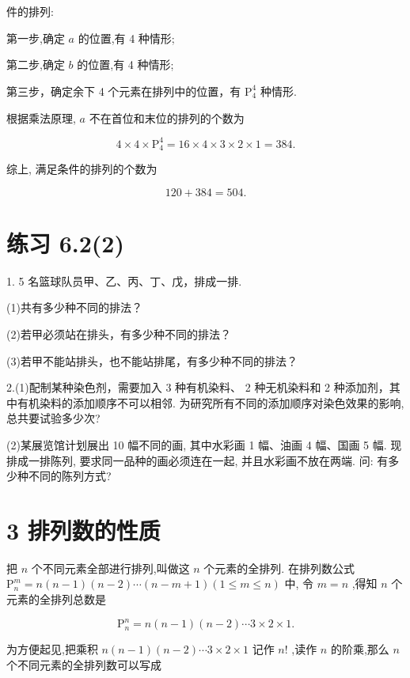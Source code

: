 \documentclass[10pt]{article}
\begin{document}
\section*{}

件的排列:

第一步,确定 \(a\) 的位置,有 4 种情形;

第二步,确定 \(b\) 的位置,有 4 种情形;

第三步，确定余下 4 个元素在排列中的位置，有 \({\mathrm{P}}_{4}^{4}\) 种情形.

根据乘法原理, \(a\) 不在首位和末位的排列的个数为

\[
4 \times  4 \times  {\mathrm{P}}_{4}^{4} = {16} \times  4 \times  3 \times  2 \times  1 = {384}.
\]

综上, 满足条件的排列的个数为

\[
{120} + {384} = {504}.
\]

\section*{练习 6.2(2)}

1. 5 名篮球队员甲、乙、丙、丁、戊，排成一排.

(1)共有多少种不同的排法？

(2)若甲必须站在排头，有多少种不同的排法？

(3)若甲不能站排头，也不能站排尾，有多少种不同的排法？

2.(1)配制某种染色剂，需要加入 3 种有机染料、 2 种无机染料和 2 种添加剂，其中有机染料的添加顺序不可以相邻. 为研究所有不同的添加顺序对染色效果的影响, 总共要试验多少次?

(2)某展览馆计划展出 10 幅不同的画, 其中水彩画 1 幅、油画 4 幅、国画 5 幅. 现排成一排陈列, 要求同一品种的画必须连在一起, 并且水彩画不放在两端. 问: 有多少种不同的陈列方式?

\section*{3 排列数的性质}

把 \(n\) 个不同元素全部进行排列,叫做这 \(n\) 个元素的全排列. 在排列数公式 \({\mathrm{P}}_{n}^{m} = n\left( {n - 1}\right) \left( {n - 2}\right) \cdots \left( {n - m + 1}\right) \left( {1 \leq  m \leq  n}\right)\) 中, 令 \(m = n\) ,得知 \(n\) 个元素的全排列总数是

\[
{\mathrm{P}}_{n}^{n} = n\left( {n - 1}\right) \left( {n - 2}\right) \cdots 3 \times  2 \times  1.
\]

为方便起见,把乘积 \(n\left( {n - 1}\right) \left( {n - 2}\right) \cdots 3 \times  2 \times  1\) 记作 \(n!\) ,读作 \(n\) 的阶乘,那么 \(n\) 个不同元素的全排列数可以写成
\end{document}
